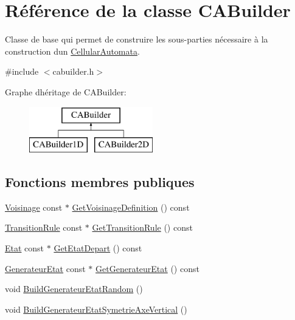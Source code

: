 \hypertarget{class_c_a_builder}{}\section{Référence de la classe C\+A\+Builder}
\label{class_c_a_builder}


Classe de base qui permet de construire les sous-\/parties nécessaire à la construction d\textquotesingle{}un \mbox{\hyperlink{class_cellular_automata}{Cellular\+Automata}}.  




{\ttfamily \#include $<$cabuilder.\+h$>$}

Graphe d\textquotesingle{}héritage de C\+A\+Builder\+:\begin{figure}[H]
\begin{center}
\leavevmode
\includegraphics[height=2.000000cm]{class_c_a_builder}
\end{center}
\end{figure}
\subsection*{Fonctions membres publiques}
\begin{DoxyCompactItemize}
\item 
\mbox{\hyperlink{class_voisinage}{Voisinage}} const  $\ast$ \mbox{\hyperlink{class_c_a_builder_a1be1b3d758b2aa2f5798680a8264ca1e}{Get\+Voisinage\+Definition}} () const
\item 
\mbox{\hyperlink{class_transition_rule}{Transition\+Rule}} const  $\ast$ \mbox{\hyperlink{class_c_a_builder_a39da3ad55920be3648c8353f17d12bed}{Get\+Transition\+Rule}} () const
\item 
\mbox{\hyperlink{class_etat}{Etat}} const  $\ast$ \mbox{\hyperlink{class_c_a_builder_a95deea41d8e12b5c5d18cb3c8e24d736}{Get\+Etat\+Depart}} () const
\item 
\mbox{\hyperlink{class_generateur_etat}{Generateur\+Etat}} const  $\ast$ \mbox{\hyperlink{class_c_a_builder_ae304de3db7f44b1192f5a1ae021036a6}{Get\+Generateur\+Etat}} () const
\item 
void \mbox{\hyperlink{class_c_a_builder_a89fe25fa1d52a13756ff47f6b163e7c0}{Build\+Generateur\+Etat\+Random}} ()
\item 
void \mbox{\hyperlink{class_c_a_builder_afbc115fc71d6b17c362e724e5bbcc781}{Build\+Generateur\+Etat\+Symetrie\+Axe\+Vertical}} ()
\end{DoxyCompactItemize}
